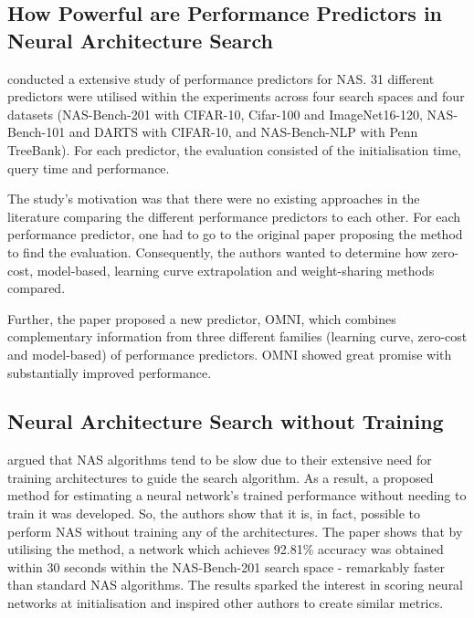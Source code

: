 \subsection{How Powerful are Performance Predictors in Neural Architecture Search}

\cite{white2021powerful} conducted a extensive study of performance predictors for \gls{NAS}. 31 different predictors were utilised within the experiments across four search spaces and four datasets (NAS-Bench-201 with CIFAR-10, Cifar-100 and ImageNet16-120, NAS-Bench-101 and DARTS with CIFAR-10, and NAS-Bench-NLP with Penn TreeBank). For each predictor, the evaluation consisted of the initialisation time, query time and performance.

The study's motivation was that there were no existing approaches in the literature comparing the different performance predictors to each other. For each performance predictor, one had to go to the original paper proposing the method to find the evaluation. Consequently, the authors wanted to determine how zero-cost, model-based, learning curve extrapolation and weight-sharing methods compared. 

Further, the paper proposed a new predictor, OMNI, which combines complementary information from three different families (learning curve, zero-cost and model-based) of performance predictors. OMNI showed great promise with substantially improved performance. 

\subsection{Neural Architecture Search without Training}
\cite{mellor2021neural} argued that \gls{NAS} algorithms tend to be slow due to their extensive need for training architectures to guide the search algorithm. As a result, a proposed method for estimating a neural network's trained performance without needing to train it was developed. So, the authors show that it is, in fact, possible to perform \gls{NAS} without training any of the architectures. The paper shows that by utilising the method, a network which achieves 92.81\% accuracy was obtained within 30 seconds within the NAS-Bench-201 search space - remarkably faster than standard \gls{NAS} algorithms. The results sparked the interest in scoring neural networks at initialisation and inspired other authors to create similar metrics. 

